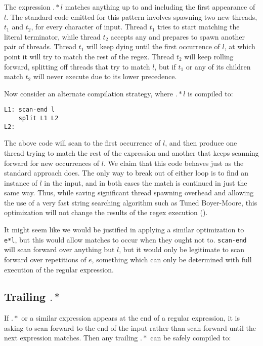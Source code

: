 The expression $.*l$ matches anything up to and including the first
appearance of $l$. The standard code emitted for this pattern involves
spawning two new threads, $t_1$ and $t_2$, for every character of input.
Thread $t_1$ tries to start matching the literal terminator, while thread $t_2$
accepts any and prepares to spawn another pair of threads.
Thread $t_1$ will keep dying until the first occurrence of $l$,
at which point it will try to match the rest of the regex.
Thread $t_2$ will keep rolling forward, splitting off threads that try
to match $l$, but if $t_1$ or any of its children match
$t_2$ will never execute due to its lower precedence.

Now consider an alternate compilation strategy, where $.*l$ is compiled
to:

\begin{verbatim}
L1: scan-end l
    split L1 L2
L2: 
\end{verbatim}

The above code will scan to the first occurrence of $l$, and then produce
one thread trying to match the rest of the expression and another that
keeps scanning forward for new occurrences of $l$. We claim that this
code behaves just as the standard approach does. The only way to
break out of either loop is to find an instance of $l$ in the input,
and in both cases the match is continued in just the same way. Thus,
while saving significant thread spawning overhead and allowing the use
of a very fast string searching algorithm such as Tuned Boyer-Moore, this
optimization will not change the results of the regex execution
(\cite{Hume1991}).

It might seem like we would be justified in applying a similar 
optimization to \verb'e*l', but this would allow matches to occur
when they ought not to. \verb'scan-end' will scan forward over anything
but $l$, but it would only be legitimate to scan forward over repetitions
of $e$, something which can only be determined with full execution of
the regular expression.

\subsection{Trailing $.*$}

If $.*$ or a similar expression appears at the end of a regular expression,
it is asking to scan forward to the end of the input rather than scan
forward until the next expression matches. Then any trailing $.*$ can
be safely compiled to:

